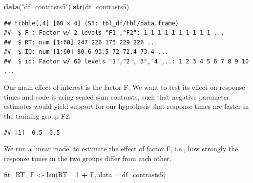 \documentclass[12pt,]{krantz}
\newenvironment{Shaded}{\begin{snugshade}}{\end{snugshade}}
\newcommand{\DataTypeTok}[1]{\textcolor[rgb]{0.13,0.29,0.53}{#1}}
\newcommand{\DecValTok}[1]{\textcolor[rgb]{0.00,0.00,0.81}{#1}}
\newcommand{\FloatTok}[1]{\textcolor[rgb]{0.00,0.00,0.81}{#1}}
\newcommand{\KeywordTok}[1]{\textcolor[rgb]{0.13,0.29,0.53}{\textbf{#1}}}
\newcommand{\NormalTok}[1]{#1}
\newcommand{\OperatorTok}[1]{\textcolor[rgb]{0.81,0.36,0.00}{\textbf{#1}}}
\newcommand{\StringTok}[1]{\textcolor[rgb]{0.31,0.60,0.02}{#1}}
\begin{document}
\begin{Shaded}
\begin{Highlighting}[]
\KeywordTok{data}\NormalTok{(}\StringTok{"df_contrasts5"}\NormalTok{)}
\KeywordTok{str}\NormalTok{(df_contrasts5)}
\end{Highlighting}
\end{Shaded}

\begin{verbatim}
## tibble[,4] [60 x 4] (S3: tbl_df/tbl/data.frame)
##  $ F : Factor w/ 2 levels "F1","F2": 1 1 1 1 1 1 1 1 1 1 ...
##  $ RT: num [1:60] 247 226 173 229 226 ...
##  $ IQ: num [1:60] 80.6 93.5 72 72.4 73.4 ...
##  $ id: Factor w/ 60 levels "1","2","3","4",..: 1 2 3 4 5 6 7 8 9 10 ...
\end{verbatim}

Our main effect of interest is the factor F. We want to test its effect on response times and code it using scaled sum contrasts, such that negative parameter estimates would yield support for our hypothesis that response times are faster in the training group F2:

\begin{Shaded}
\end{Shaded}

\begin{verbatim}
## [1] -0.5  0.5
\end{verbatim}

We run a linear model to estimate the effect of factor F, i.e., how strongly the response times in the two groups differ from each other.

\begin{Shaded}
\begin{Highlighting}[]
\NormalTok{fit_RT_F <-}\StringTok{ }\KeywordTok{lm}\NormalTok{(RT }\OperatorTok{~}\StringTok{ }\DecValTok{1} \OperatorTok{+}\StringTok{ }\NormalTok{F,}
                 \DataTypeTok{data =}\NormalTok{ df_contrasts5) }
\end{Highlighting}
\end{Shaded}

\begin{Shaded}
\end{Shaded}
\end{document}
